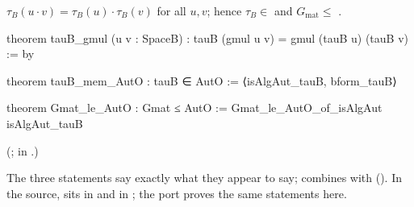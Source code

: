 \begin{theorem}\label{ch21:thm:tauBgmul}
$\tau_B(u\cdot v)=\tau_B(u)\cdot\tau_B(v)$ for all $u,v$; hence $\tau_B\in$  and
$G_{\mathrm{mat}}\le$ .
\end{theorem}
\begin{leancode}
theorem tauB_gmul (u v : SpaceB) : tauB (gmul u v) = gmul (tauB u) (tauB v) := by
\end{leancode}
\begin{leancode}
theorem tauB_mem_AutO : tauB ∈ AutO := ⟨isAlgAut_tauB, bform_tauB⟩
\end{leancode}
\begin{leancode}
theorem Gmat_le_AutO : Gmat ≤ AutO := Gmat_le_AutO_of_isAlgAut isAlgAut_tauB
\end{leancode}
(;  in
.)
\begin{dictionary}
The three statements say exactly what they appear to say;  combines
 with  ().
In the source,  sits in  and  in
; the port proves the same statements here.
\end{dictionary}
